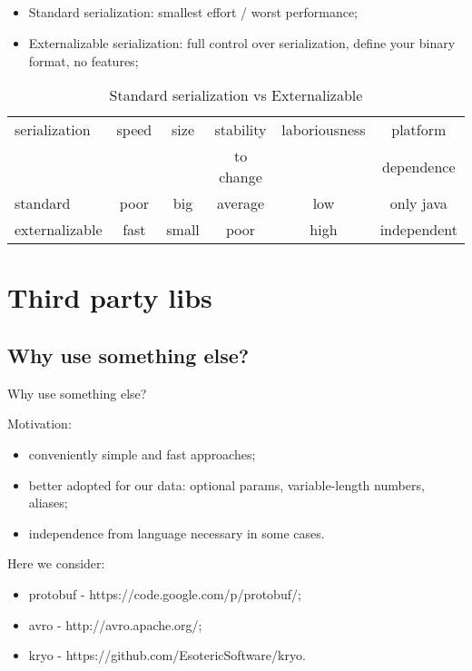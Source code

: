 \documentclass[8pt]{beamer}
\begin{document}
\subsection{\partname}
\begin{frame}{\partname}
  \begin{itemize}
    \item Standard serialization: smallest effort / worst performance;
    \item Externalizable serialization: full control over serialization, define your binary format, no features;
  \end{itemize}
  \begin{table}
    \begin{tabular}{l | c | c | c | c | c }
      serialization  & speed & size & stability & laboriousness & platform \\
      &       &      & to change &               & dependence\\
      \hline \hline
      standard       & poor & big   & average & low  & only java  \\
      \hline
      externalizable & fast & small & poor    & high & independent
    \end{tabular}

    \caption{Standard serialization vs Externalizable}
  \end{table}

\end{frame}

\section{Third party libs}
\renewcommand{\partname}{Why use something else?}
\subsection{\partname}
\begin{frame}{\partname}

  Motivation:
  \begin{itemize}
    \item conveniently simple and fast approaches;
    \item better adopted for our data: optional params, variable-length numbers, aliases;
    \item independence from language necessary in some cases.
  \end{itemize}

  Here we consider:
  \begin{itemize}
    \item protobuf - https://code.google.com/p/protobuf/;
    \item avro - http://avro.apache.org/;
    \item kryo - https://github.com/EsotericSoftware/kryo.
  \end{itemize}
\end{frame}
\end{document}
